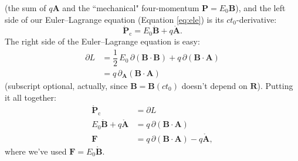 \documentclass[12pt]{article}
\renewcommand{\vv}[1]{\mathbf{#1}}
\begin{document}
(the sum of $q \vv A$ and the ``mechanical" four-momentum $\vv P = E_0 \vv B$), and the left side of our Euler--Lagrange equation (Equation \ref{eq:ele}) is its $ct_0$-derivative:
\begin{equation*}
\mathring{\vv P}_\textrm{c}  =  E_0 \mathring{\vv B} + q \mathring{\vv A} .
\end{equation*}
The right side of the Euler--Lagrange equation is easy:
\begin{equation*}
\begin{split}
\partialup L &= \dfrac{1}{2} \, E_0 \, \partialup (\vv B \cdot \vv B) + q \, \partialup (\vv B \cdot \vv A) \\[2pt]
&= q \, \partialup_{\vv A} (\vv B \cdot \vv A)
\end{split}
\end{equation*}
(subscript optional, actually, since $\vv B = \vv B(ct_0)$ doesn't depend on $\vv R$). Putting it all together:
\begin{equation}\label{eq:emeom}
\begin{split}
\mathring{\vv P}_\textrm{c} &= \partialup L \\[2pt]
E_0 \mathring{\vv B} + q \mathring{\vv A} &= q \, \partialup (\vv B \cdot \vv A) \\[3pt]
\vv F &= q \, \partialup (\vv B \cdot \vv A) - q \mathring{\vv A} ,
\end{split}
\end{equation}
where we've used $\vv F = E_0 \mathring{\vv B}$.
\end{document}
